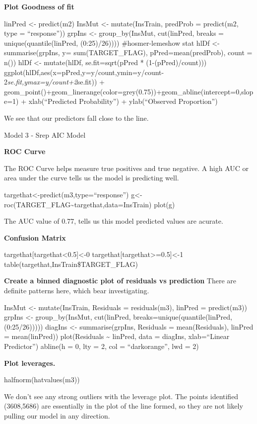 \documentclass[]{article}
\begin{document}
\textbf{Plot Goodness of fit}

linPred \textless- predict(m2) InsMut \textless- mutate(InsTrain,
predProb = predict(m2, type = ``response'')) grpIns \textless-
group\_by(InsMut, cut(linPred, breaks = unique(quantile(linPred,
(0:25)/26)))) \#hosmer-lemeshow stat hlDf \textless- summarise(grpIns,
y= sum(TARGET\_FLAG), pPred=mean(predProb), count = n()) hlDf \textless-
mutate(hlDf, se.fit=sqrt(pPred * (1-(pPred)/count)))
ggplot(hlDf,aes(x=pPred,y=y/count,ymin=y/count-2\emph{se.fit,ymax=y/count+2}se.fit))
+
geom\_point()+geom\_linerange(color=grey(0.75))+geom\_abline(intercept=0,slope=1)
+ xlab(``Predicted Probability'') + ylab(``Observed Proportion'')

We see that our predictors fall close to the line.

Model 3 - Srep AIC Model

\textbf{ROC Curve}

The ROC Curve helps measure true positives and true negative. A high AUC
or area under the curve tells us the model is predicting well.

targethat\textless-predict(m3,type=``response'')
g\textless-roc(TARGET\_FLAG\textasciitilde targethat,data=InsTrain)
plot(g)

The AUC value of 0.77, tells us this model predicted values are acurate.

\textbf{Confusion Matrix}

targethat{[}targethat\textless0.5{]}\textless-0
targethat{[}targethat\textgreater=0.5{]}\textless-1
table(targethat,InsTrain\$TARGET\_FLAG)

\textbf{Create a binned diagnostic plot of residuals vs prediction}
There are definite patterns here, which bear investigating.

InsMut \textless- mutate(InsTrain, Residuals = residuals(m3), linPred =
predict(m3)) grpIns \textless- group\_by(InsMut, cut(linPred,
breaks=unique(quantile(linPred, (0:25/26))))) diagIns \textless-
summarise(grpIns, Residuals = mean(Residuals), linPred = mean(linPred))
plot(Residuals \textasciitilde{} linPred, data = diagIns, xlab=``Linear
Predictor'') abline(h = 0, lty = 2, col = ``darkorange'', lwd = 2)

\textbf{Plot leverages.}

halfnorm(hatvalues(m3))

We don't see any strong outliers with the leverage plot. The points
identified (3608,5686) are essentially in the plot of the line formed,
so they are not likely pulling our model in any direction.
\end{document}
